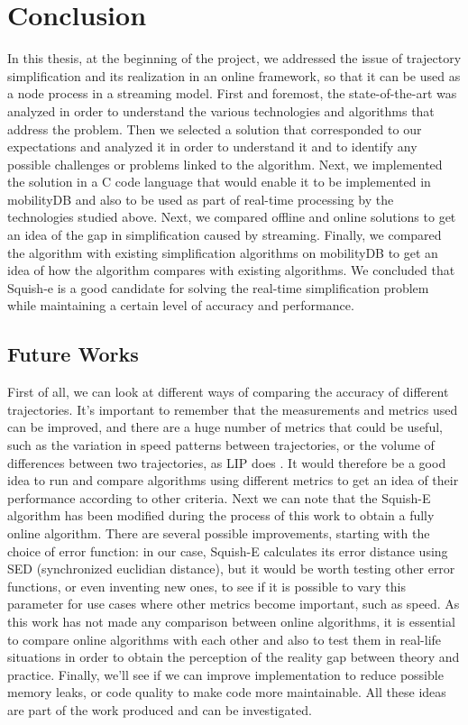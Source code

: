 
\chapter{Conclusion}

In this thesis, at the beginning of the project, we addressed the issue of trajectory simplification and its realization in an online framework, so that it can be used as a node process in a streaming model. First and foremost, the state-of-the-art was analyzed in order to understand the various technologies and algorithms that address the problem. Then we selected a solution that corresponded to our expectations and analyzed it in order to understand it and to identify any possible challenges or problems linked to the algorithm. Next, we implemented the solution in a C code language that would enable it to be implemented in mobilityDB and also to be used as part of real-time processing by the technologies studied above. Next, we compared offline and online solutions to get an idea of the gap in simplification caused by streaming. Finally, we compared the algorithm with existing simplification algorithms on mobilityDB to get an idea of how the algorithm compares with existing algorithms. We concluded that Squish-e is a good candidate for solving the real-time simplification problem while maintaining a certain level of accuracy and performance. 



\section{Future Works}
First of all, we can look at different ways of comparing the accuracy of different trajectories. It's important to remember that the measurements and metrics used can be improved, and there are a huge number of metrics that could be useful, such as the variation in speed patterns between trajectories, or the volume of differences between two trajectories, as LIP does \cite{4438678}. It would therefore be a good idea to run and compare algorithms using different metrics to get an idea of their performance according to other criteria. Next we can note that the Squish-E algorithm has been modified during the process of this work to obtain a fully online algorithm. There are several possible improvements, starting with the choice of error function: in our case, Squish-E calculates its error distance using SED (synchronized euclidian distance), but it would be worth testing other error functions, or even inventing new ones, to see if it is possible to vary this parameter for use cases where other metrics become important, such as speed. As this work has not made any comparison between online algorithms, it is essential to compare online algorithms with each other and also to test them in real-life situations in order to obtain the perception of the reality gap between theory and practice. Finally, we'll see if we can improve implementation to reduce possible memory leaks, or code quality to make code more maintainable. All these ideas are part of the work produced and can be investigated. 
